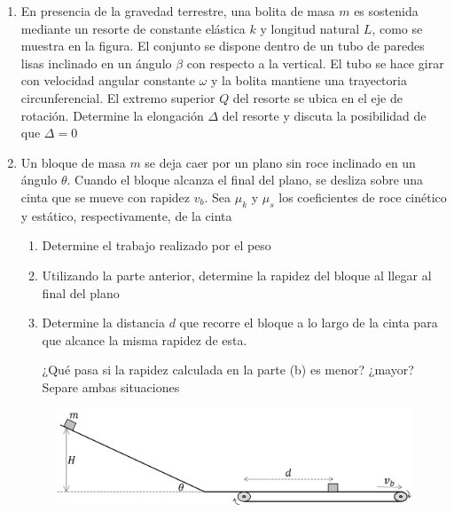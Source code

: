 \documentclass[letterpaper,11pt]{article}
\begin{document}
\begin{enumerate}
\item En presencia de la gravedad terrestre, una bolita de masa $m$ es sostenida mediante un resorte de constante elástica $k$ y longitud natural $L$, como se muestra en la figura. El conjunto se dispone dentro de un tubo de paredes lisas inclinado en un ángulo $\beta$ con respecto a la vertical. El tubo se hace girar con velocidad angular constante $\omega$ y la bolita mantiene una trayectoria circunferencial. El extremo superior $Q$ del resorte se ubica en el eje de rotación. Determine la elongación $\Delta$ del resorte y discuta la posibilidad de que $\Delta = 0$

\begin{figure}[H]
    \centering
    
\end{figure}


\item Un bloque de masa $m$ se deja caer por un plano sin roce inclinado en un ángulo $\theta$. Cuando el bloque alcanza el final del plano, se desliza sobre una cinta que se mueve con rapidez $v_b$. Sea $\mu_k$ y $\mu_s$ los coeficientes de roce cinético y estático, respectivamente, de la cinta

\begin{enumerate}
    \item Determine el trabajo realizado por el peso
    
    \item Utilizando la parte anterior, determine la rapidez del bloque al llegar al final del plano
    
    \item Determine la distancia $d$ que recorre el bloque a lo largo de la cinta para que alcance la misma rapidez de esta.
    
    ¿Qué pasa si la rapidez calculada en la parte (b) es menor? ¿mayor? Separe ambas situaciones
\end{enumerate}

\begin{figure}[H]
    \centering
    \includegraphics[width=0.8\linewidth]{2023-1/img/TD 3/cinta.png}
\end{figure}


%   

\end{enumerate}
\end{document}
